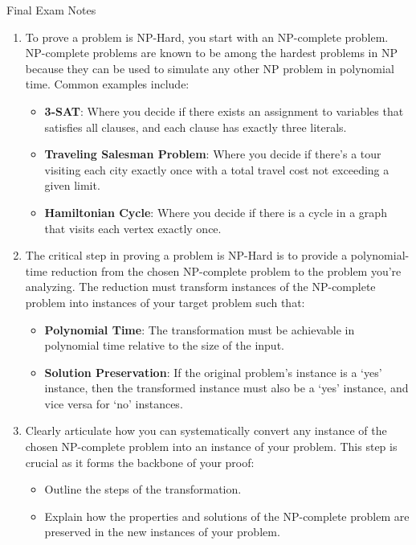 \begin{examnotes}{Final Exam Notes}
\begin{highlight}
        \begin{enumerate}
            \item To prove a problem is NP-Hard, you start with an NP-complete problem. NP-complete problems are known to be among the hardest problems in NP because they can be used to simulate any 
            other NP problem in polynomial time. Common examples include:
            \begin{itemize}
                \item \textbf{3-SAT}: Where you decide if there exists an assignment to variables that satisfies all clauses, and each clause has exactly three literals.
                \item \textbf{Traveling Salesman Problem}: Where you decide if there's a tour visiting each city exactly once with a total travel cost not exceeding a given limit.
                \item \textbf{Hamiltonian Cycle}: Where you decide if there is a cycle in a graph that visits each vertex exactly once.
            \end{itemize}
            \item The critical step in proving a problem is NP-Hard is to provide a polynomial-time reduction from the chosen NP-complete problem to the problem you're analyzing. The reduction must 
            transform instances of the NP-complete problem into instances of your target problem such that:
            \begin{itemize}
                \item \textbf{Polynomial Time}: The transformation must be achievable in polynomial time relative to the size of the input.
                \item \textbf{Solution Preservation}: If the original problem's instance is a `yes' instance, then the transformed instance must also be a `yes' instance, and vice versa for `no' instances.
            \end{itemize}
            \item Clearly articulate how you can systematically convert any instance of the chosen NP-complete problem into an instance of your problem. This step is crucial as it forms the backbone 
            of your proof:
            \begin{itemize}
                \item Outline the steps of the transformation.
                \item Explain how the properties and solutions of the NP-complete problem are preserved in the new instances of your problem.

\end{itemize}
\end{enumerate}
\end{highlight}
\end{examnotes}
